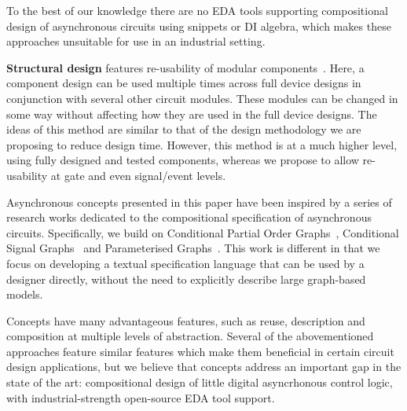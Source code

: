 \documentclass[british, journal]{IEEEtran}
\begin{document}
To the best of our knowledge there are no EDA tools supporting
compositional design of asynchronous circuits using snippets or DI algebra,
which makes these approaches unsuitable for use in an industrial setting.

\textbf{Structural design} features re-usability of modular components~\cite{modular-circuit-design}.
Here, a component design can be used multiple times across full device
designs in conjunction with several other circuit modules. These modules
can be changed in some way without affecting how they are used in
the full device designs. The ideas of this method are similar to that
of the design methodology we are proposing to reduce design time.
However, this method is at a much higher level, using fully designed
and tested components, whereas we propose to allow re-usability
at gate and even signal/event levels.

Asynchronous concepts presented in this paper have been inspired by a
series of research works dedicated to the compositional specification of
asynchronous circuits. Specifically, we build on Conditional Partial
Order Graphs~\cite{CPOG1}, Conditional Signal Graphs~\cite{mokhov2012adapting}
and Parameterised Graphs~\cite{2014_mokhov_pg}. This work is different in that
we focus on developing a textual specification language that can be used by a
designer directly, without the need to explicitly describe large graph-based models.

Concepts have many advantageous features, such as reuse, description and composition
at multiple levels of abstraction. Several of the abovementioned approaches feature similar
features which make them beneficial in certain circuit design applications, but we believe that
concepts address an important gap in the state of the art: compositional design of little
digital asyncrhonous control logic, with industrial-strength open-source EDA tool support.

\end{document}
